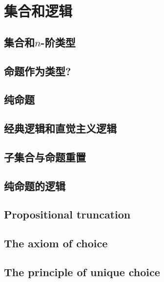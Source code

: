\chapter{集合和逻辑}
\label{cha:logic}


\section{集合和\texorpdfstring{$n$}{n}-阶类型}
\label{sec:basics-sets}


\section{命题作为类型?}
\label{subsec:pat?}


\section{纯命题}
\label{subsec:hprops}


\section{经典逻辑和直觉主义逻辑}
\label{sec:intuitionism}


\section{子集合与命题重置}
\label{subsec:prop-subsets}


\section{纯命题的逻辑}
\label{subsec:logic-hprop}


\section{Propositional truncation}
\label{subsec:prop-trunc}


\section{The axiom of choice}
\label{sec:axiom-choice}


\section{The principle of unique choice}
\label{sec:unique-choice}


